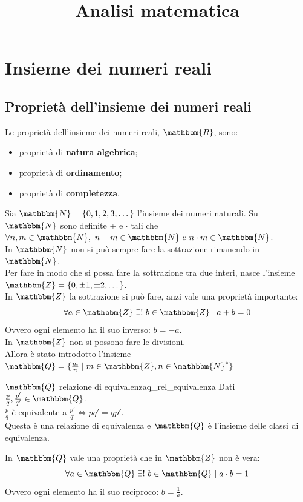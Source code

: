 \documentclass[12pt]{report}
\date{}
\title{Analisi matematica}
\newcounter{definition}
\begin{document}
	{
		\let\cleardoublepage\clearpage
		\maketitle
		\tableofcontents
	}
	\chapter{Insieme dei numeri reali}
	\section{Proprietà dell'insieme dei numeri reali}
	Le proprietà dell'insieme dei numeri reali, $\mathbbm{R}$, sono:
	\begin{itemize}
		\item proprietà di \textbf{natura algebrica};
		\item proprietà di \textbf{ordinamento};
		\item proprietà di \textbf{completezza}.
	\end{itemize}
	Sia $\mathbbm{N} = \{0, 1, 2, 3, \dots\}$ l'insieme dei numeri naturali. Su $\mathbbm{N}$ sono definite + e $\cdot$ tali che $\forall n, m \in \mathbbm{N},\ n+m \in \mathbbm{N} \ e \ n\cdot m \in \mathbbm{N}$. \\
	In $\mathbbm{N}$ non si può sempre fare la sottrazione rimanendo in $\mathbbm{N}$. \\
	Per fare in modo che si possa fare la sottrazione tra due interi, nasce l'insieme $\mathbbm{Z} = \{0, \pm 1, \pm 2, \dots\}$. \\
	In $\mathbbm{Z}$ la sottrazione si può fare, anzi vale una proprietà importante:
	\[
	\forall a \in \mathbbm{Z}\ \exists !\ b \in \mathbbm{Z} \mid a + b = 0
	\]
	Ovvero ogni elemento ha il suo inverso: $b = -a$. \\
	In $\mathbbm{Z}$ non si possono fare le divisioni. \\
	Allora è stato introdotto l'insieme $\mathbbm{Q} = \{ \frac{m}{n} \mid m \in \mathbbm{Z}, n \in \mathbbm{N}^*\}$
	\begin{definition}{$\mathbbm{Q}$ relazione di equivalenza}{q_rel_equivalenza}
		Dati $\frac{p}{q}, \frac{p'}{q'} \in \mathbbm{Q}$. \\
		$\frac{p}{q}$ è equivalente a $\frac{p'}{q'} \iff pq'=qp'$. \\
		Questa è una relazione di equivalenza e $\mathbbm{Q}$ è l'insieme delle classi di equivalenza.
	\end{definition}
	In $\mathbbm{Q}$ vale una proprietà che in $\mathbbm{Z}$ non è vera:
	\[
	\forall a \in \mathbbm{Q}\ \exists!\ b \in \mathbbm{Q} \mid a \cdot b = 1
	\]
	Ovvero ogni elemento ha il suo reciproco: $b = \frac{1}{a}$. \\
\end{document}
